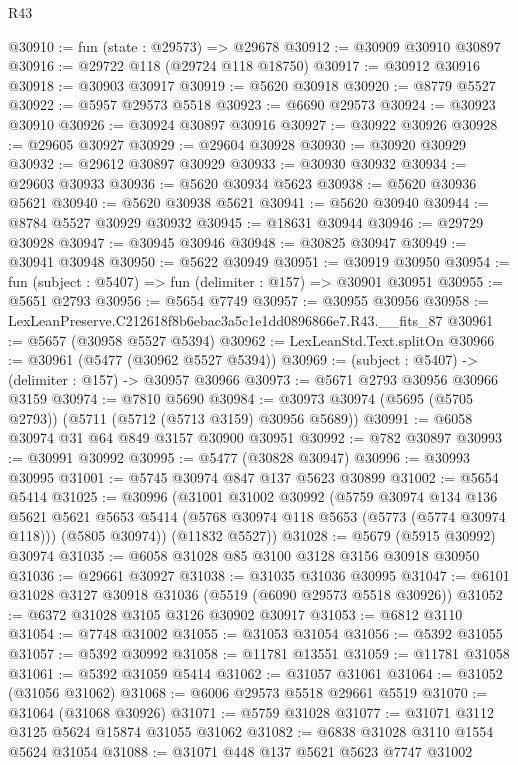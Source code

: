 \begin{lexlean}{R43}
\begin{coremodule}
@30910 := fun (state : @29573) => @29678
@30912 := @30909 @30910 @30897
@30916 := @29722 @118 (@29724 @118 @18750)
@30917 := @30912 @30916
@30918 := @30903 @30917
@30919 := @5620 @30918
@30920 := @8779 @5527
@30922 := @5957 @29573 @5518
@30923 := @6690 @29573
@30924 := @30923 @30910
@30926 := @30924 @30897 @30916
@30927 := @30922 @30926
@30928 := @29605 @30927
@30929 := @29604 @30928
@30930 := @30920 @30929
@30932 := @29612 @30897 @30929
@30933 := @30930 @30932
@30934 := @29603 @30933
@30936 := @5620 @30934 @5623
@30938 := @5620 @30936 @5621
@30940 := @5620 @30938 @5621
@30941 := @5620 @30940
@30944 := @8784 @5527 @30929 @30932
@30945 := @18631 @30944
@30946 := @29729 @30928
@30947 := @30945 @30946
@30948 := @30825 @30947
@30949 := @30941 @30948
@30950 := @5622 @30949
@30951 := @30919 @30950
@30954 := fun (subject : @5407) => fun (delimiter : @157) => @30901 @30951
@30955 := @5651 @2793
@30956 := @5654 @7749
@30957 := @30955 @30956
@30958 := LexLeanPreserve.C212618f8b6ebac3a5c1e1dd0896866e7.R43.__fits_87
@30961 := @5657 (@30958 @5527 @5394)
@30962 := LexLeanStd.Text.splitOn
@30966 := @30961 (@5477 (@30962 @5527 @5394))
@30969 := (subject : @5407) -> (delimiter : @157) -> @30957 @30966
@30973 := @5671 @2793 @30956 @30966 @3159
@30974 := @7810 @5690
@30984 := @30973 @30974 (@5695 (@5705 @2793)) (@5711 (@5712 (@5713 @3159) @30956 @5689))
@30991 := @6058 @30974 @31 @64 @849 @3157 @30900 @30951
@30992 := @782 @30897
@30993 := @30991 @30992
@30995 := @5477 (@30828 @30947)
@30996 := @30993 @30995
@31001 := @5745 @30974 @847 @137 @5623 @30899
@31002 := @5654 @5414
@31025 := @30996
    (@31001
      @31002
      @30992
      (@5759
        @30974
        @134
        @136
        @5621
        @5621
        @5653
        @5414
        (@5768 @30974 @118 @5653 (@5773 (@5774 @30974 @118)))
        (@5805 @30974))
      (@11832 @5527))
@31028 := @5679 (@5915 @30992) @30974
@31035 := @6058 @31028 @85 @3100 @3128 @3156 @30918 @30950
@31036 := @29661 @30927
@31038 := @31035 @31036 @30995
@31047 := @6101 @31028 @3127 @30918 @31036 (@5519 (@6090 @29573 @5518 @30926))
@31052 := @6372 @31028 @3105 @3126 @30902 @30917
@31053 := @6812 @3110
@31054 := @7748 @31002
@31055 := @31053 @31054
@31056 := @5392 @31055
@31057 := @5392 @30992
@31058 := @11781 @13551
@31059 := @11781 @31058
@31061 := @5392 @31059 @5414
@31062 := @31057 @31061
@31064 := @31052 (@31056 @31062)
@31068 := @6006 @29573 @5518 @29661 @5519
@31070 := @31064 (@31068 @30926)
@31071 := @5759 @31028
@31077 := @31071 @3112 @3125 @5624 @15874 @31055 @31062
@31082 := @6838 @31028 @3110 @1554 @5624 @31054
@31088 := @31071 @448 @137 @5621 @5623 @7747 @31002

\end{coremodule}
\end{lexlean}
